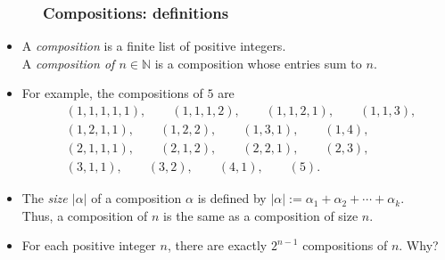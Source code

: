 \documentclass{beamer}
\newcommand{\NN}{{\mathbb N}}
\newcommand{\fti}[1]{\frametitle{\ \ \ \ \ #1}}
\newcommand{\abs}[1]{\left| #1 \right|}
\newcommand{\tup}[1]{\left( #1 \right)}
\newcommand{\defn}[1]{{\color{darkred}\emph{#1}}} %
\theoremstyle{plain}
\begin{document}
\begin{frame}
\fti{Compositions: definitions}

\begin{itemize}
      
\item A \defn{composition} is a finite list of positive integers.
      \\
      A \defn{composition of $n \in \NN$} is a composition whose
      entries sum to $n$. \pause

\item For example, the compositions of $5$ are
      \begin{align*}
      &
      \tup{1, 1, 1, 1, 1}, \qquad
      \tup{1, 1, 1, 2}, \qquad
      \tup{1, 1, 2, 1}, \qquad
      \tup{1, 1, 3}, \\ &
      \tup{1, 2, 1, 1}, \qquad
      \tup{1, 2, 2}, \qquad
      \tup{1, 3, 1}, \qquad
      \tup{1, 4}, \\ &
      \tup{2, 1, 1, 1}, \qquad
      \tup{2, 1, 2}, \qquad
      \tup{2, 2, 1}, \qquad
      \tup{2, 3}, \\ &
      \tup{3, 1, 1}, \qquad
      \tup{3, 2}, \qquad
      \tup{4, 1}, \qquad
      \tup{5} .
      \end{align*}

\pause

\item The \defn{size $\abs{\alpha}$} of a composition $\alpha$
      is defined by $\abs{\alpha} := \alpha_1 + \alpha_2 + \cdots + \alpha_k$.
      \\
      Thus, a composition of $n$ is the same as a composition
      of size $n$.

\pause

\item For each positive integer $n$, there are exactly $2^{n-1}$
      compositions of $n$. Why?

\end{itemize}

\end{frame}
\end{document}
